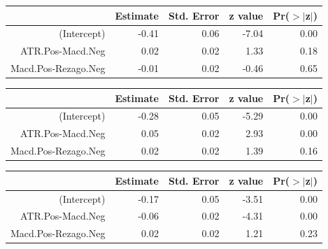 \documentclass[a4paper,12pt]{Latex/Classes/PhDthesisPSnPDF}
\begin{document}
\begin{center}
\begin{table}[ht]
\centering
\begin{tabular}{rrrrr}
  \hline
 & Estimate & Std. Error & z value & Pr($>$$|$z$|$) \\ 
  \hline
(Intercept) & -0.41 & 0.06 & -7.04 & 0.00 \\ 
  ATR.Pos-Macd.Neg & 0.02 & 0.02 & 1.33 & 0.18 \\ 
  Macd.Pos-Rezago.Neg & -0.01 & 0.02 & -0.46 & 0.65 \\ 
   \hline
\end{tabular}
\end{table}\end{center}

\begin{center}
\begin{table}[ht]
\centering
\begin{tabular}{rrrrr}
  \hline
 & Estimate & Std. Error & z value & Pr($>$$|$z$|$) \\ 
  \hline
(Intercept) & -0.28 & 0.05 & -5.29 & 0.00 \\ 
  ATR.Pos-Macd.Neg & 0.05 & 0.02 & 2.93 & 0.00 \\ 
  Macd.Pos-Rezago.Neg & 0.02 & 0.02 & 1.39 & 0.16 \\ 
   \hline
\end{tabular}
\end{table}\end{center}

\begin{center}
\begin{table}[ht]
\centering
\begin{tabular}{rrrrr}
  \hline
 & Estimate & Std. Error & z value & Pr($>$$|$z$|$) \\ 
  \hline
(Intercept) & -0.17 & 0.05 & -3.51 & 0.00 \\ 
  ATR.Pos-Macd.Neg & -0.06 & 0.02 & -4.31 & 0.00 \\ 
  Macd.Pos-Rezago.Neg & 0.02 & 0.02 & 1.21 & 0.23 \\ 
   \hline
\end{tabular}
\end{table}\end{center}
\end{document}
